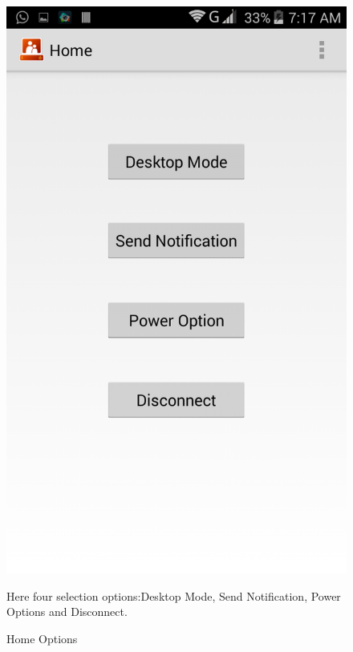 \begin{figure}
\begin{center}
\scalebox{0.25}
{\includegraphics{home.png}}
\caption{Home Options}  
\end{center}
Here four selection options:Desktop Mode, Send Notification, Power Options and Disconnect.
\end{figure}

